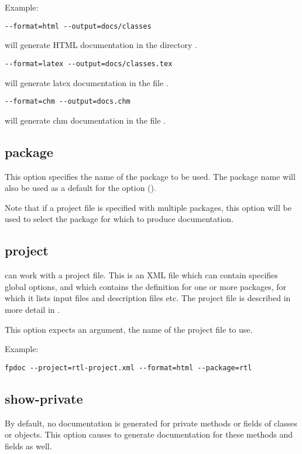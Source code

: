 Example:
\begin{verbatim}
--format=html --output=docs/classes
\end{verbatim}
will generate HTML documentation in the directory .
\begin{verbatim}
--format=latex --output=docs/classes.tex
\end{verbatim}
will generate latex documentation in the file .
\begin{verbatim}
--format=chm --output=docs.chm
\end{verbatim}
will generate chm documentation in the file .

\subsection{package}
\label{suse:package}
This option specifies the name of the package to be used. The package name
will also be used as a default for the  option ().

Note that if a project file is specified with multiple packages, this option
will be used to select the package for which to produce documentation.

\subsection{project}
\label{suse:project}
\fpdoc can work with a project file. This is an XML file which can contain
specifies global options, and which contains the definition for one or more
packages, for which it lists input files and description files etc.
The project file is described in more detail in .

This option expects an argument, the name of the project file to use.

Example:
\begin{verbatim}
fpdoc --project=rtl-project.xml --format=html --package=rtl
\end{verbatim}

\subsection{show-private}
\label{suse:showprivate}
By default, no documentation is generated for private methods or fields of
classes or objects. This option causes \fpdoc to generate documentation 
for these methods and fields as well.


